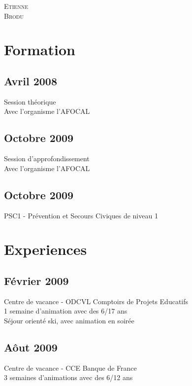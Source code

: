 


\pagestyle{empty}

	{
		\LARGE{\textsc{Etienne}\\
				\textsc{Brodu}}
	}
	
\section{Formation}
	\subsection{Avril 2008}
		{Session th\'{e}orique\\Avec l'organisme l'AFOCAL}

	\subsection{Octobre 2009}
		{Session d'approfondissement\\Avec l'organisme l'AFOCAL}

	\subsection{Octobre 2009}
		{PSC1 - Pr\'{e}vention et Secours Civiques de niveau 1}

\section{Experiences}
	\subsection{F\'{e}vrier 2009}
		{Centre de vacance - ODCVL Comptoirs de Projets Educatifs\\
		 1 semaine d'animation avec des 6/17 ans\\
		 S\'{e}jour orient\'{e} ski, avec animation en soir\'{e}e}

	\subsection{A\^{o}ut 2009}
		{Centre de vacance - CCE Banque de France\\
		 3 semaines d'animations avec des 6/12 ans}
		
